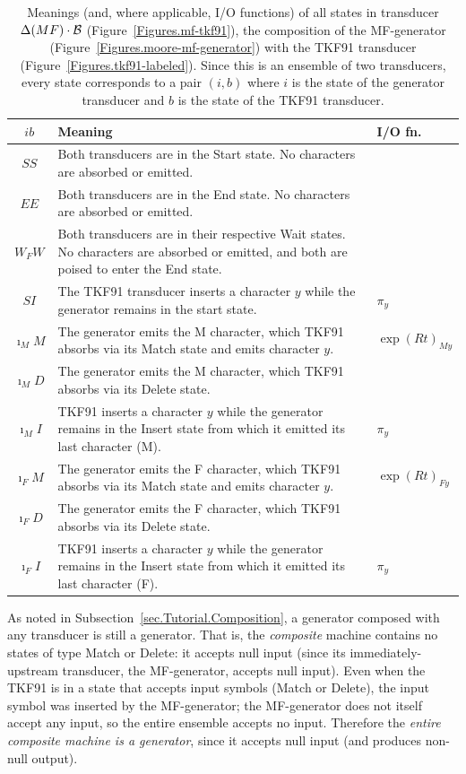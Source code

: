 \documentclass{article}
\newcommand{\secref}[1]{Subsection~\ref{sec.#1}}
\newcommand{\tablabel}[1]{\label{tab.#1}}
\newcommand{\figref}[1]{Figure~\ref{Figures.#1}}
\newcommand\tkf{{\cal B}}
\newcommand\generate{\Delta}
\begin{document}
\begin{table}
\begin{tabular}{c|p{}|p{}}
$i b$ & Meaning & I/O fn. \\
\hline
$SS$ & Both transducers are in the Start state.  No characters are  absorbed or emitted. &  \\
$EE$ & Both transducers are in the End state.  No characters are  absorbed or emitted. &  \\
$W_FW$ & Both transducers are in their respective Wait states.  No characters are absorbed or emitted, and both are poised to enter the End state.  &  \\
$SI$ & The TKF91 transducer inserts a character $y$ while the generator remains in the start state.  & $\pi_y$ \\
$\imath_MM$ & The  generator emits the M character, which TKF91 absorbs via its Match state and emits character $y$. & $\exp(Rt)_{My}$ \\
$\imath_MD$ & The  generator emits the M character, which TKF91 absorbs via its Delete state. &  \\
$\imath_MI$ & TKF91 inserts a character $y$ while the generator remains in the Insert state from which it emitted its last character (M).  & $\pi_y$ \\
$\imath_FM$ & The  generator emits the F character, which TKF91 absorbs via its Match state and emits character $y$. & $\exp(Rt)_{Fy}$ \\
$\imath_FD$ & The  generator emits the F character, which TKF91 absorbs via its Delete state. &  \\
$\imath_FI$ & TKF91 inserts a character $y$ while the generator remains in the Insert state from which it emitted its last character (F).  & $\pi_y$ \\
\end{tabular}
\caption{ \tablabel{mf-tkf91} Meanings (and, where applicable, I/O functions) of all states in
transducer $\generate(MF) \cdot \tkf$ (\figref{mf-tkf91}),
the composition of the MF-generator (\figref{moore-mf-generator})
with the TKF91 transducer (\figref{tkf91-labeled}).
Since this is an ensemble of two transducers, every state corresponds to a pair $(i,b)$
where
$i$ is the state of the generator transducer and
$b$ is the state of the TKF91 transducer.
 }
\end{table}


As noted in \secref{Tutorial.Composition}, a generator composed with any transducer is still a generator.
That is, the {\em composite} machine contains no states of
 type Match or Delete: it accepts null input (since its immediately-upstream
transducer, the MF-generator, accepts null input).  
Even when the TKF91 is in a state that accepts input symbols (Match or Delete),
the input symbol was inserted by the MF-generator;
the MF-generator does not itself accept any input,
so the entire ensemble accepts no input.  
Therefore the {\em entire composite machine is a generator}, since it accepts null input
(and produces non-null output).  
\end{document}
